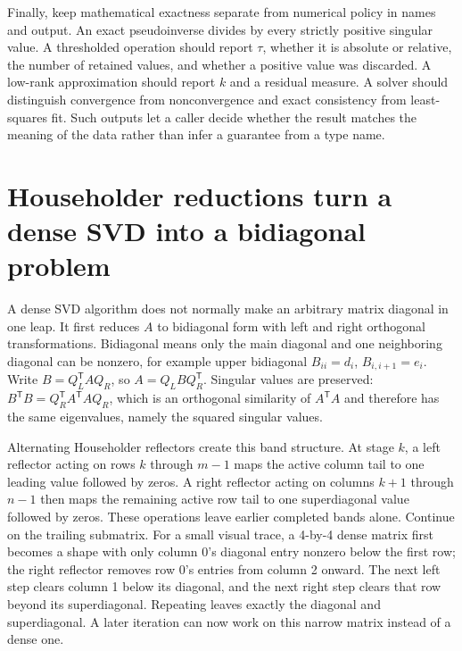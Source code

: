 Finally, keep mathematical exactness separate from numerical policy in names and output. An exact pseudoinverse divides by every strictly positive singular value. A thresholded operation should report \(\tau\), whether it is absolute or relative, the number of retained values, and whether a positive value was discarded. A low-rank approximation should report \(k\) and a residual measure. A solver should distinguish convergence from nonconvergence and exact consistency from least-squares fit. Such outputs let a caller decide whether the result matches the meaning of the data rather than infer a guarantee from a type name.

\section{Householder reductions turn a dense SVD into a bidiagonal problem}\label{02-foundations-ii-ch038-householder-reductions-turn-a-dense-svd-into-a-bidiagonal-problem}

\hypertarget{02-foundations-ii-ch038-householder-reductions-turn-a-dense-svd-into-a-bidiagonal-problem}{}

A dense SVD algorithm does not normally make an arbitrary matrix diagonal in one leap. It first reduces \(A\) to bidiagonal form with left and right orthogonal transformations. Bidiagonal means only the main diagonal and one neighboring diagonal can be nonzero, for example upper bidiagonal \(B_{ii}=d_i\), \(B_{i,i+1}=e_i\). Write \(B=Q_L^\mathsf TAQ_R\), so \(A=Q_LBQ_R^\mathsf T\). Singular values are preserved: \(B^\mathsf TB=Q_R^\mathsf TA^\mathsf TAQ_R\), which is an orthogonal similarity of \(A^\mathsf TA\) and therefore has the same eigenvalues, namely the squared singular values.

Alternating Householder reflectors create this band structure. At stage \(k\), a left reflector acting on rows \(k\) through \(m-1\) maps the active column tail to one leading value followed by zeros. A right reflector acting on columns \(k+1\) through \(n-1\) then maps the remaining active row tail to one superdiagonal value followed by zeros. These operations leave earlier completed bands alone. Continue on the trailing submatrix. For a small visual trace, a 4-by-4 dense matrix first becomes a shape with only column 0's diagonal entry nonzero below the first row; the right reflector removes row 0's entries from column 2 onward. The next left step clears column 1 below its diagonal, and the next right step clears that row beyond its superdiagonal. Repeating leaves exactly the diagonal and superdiagonal. A later iteration can now work on this narrow matrix instead of a dense one.

